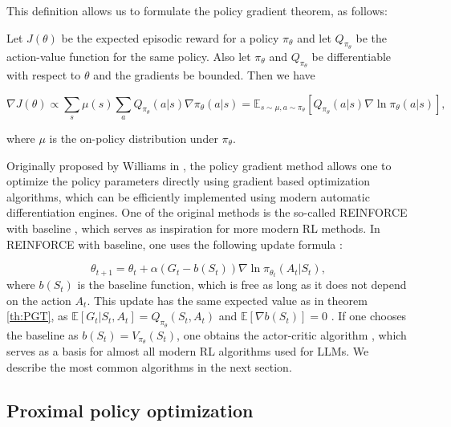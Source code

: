 This definition allows us to formulate the policy gradient theorem, as follows\cite{SuttonPolicyGradientTheorem, SuttonAndBarto2018, lehmann2024definitiveguidepolicygradients}:


\begin{theorem}
    Let $J(\theta)$ be the expected episodic reward for a policy $\pi_\theta$ and let $Q_{\pi_\theta}$ be the action-value function for the same policy. Also let $\pi_\theta$ and $Q_{\pi_\theta}$ be differentiable with respect to $\theta$ and the gradients be bounded. Then we have

    \begin{equation}
        \nabla J(\theta)\propto\sum_s\mu(s)\sum_a Q_{\pi_\theta}(a | s)\nabla\pi_\theta(a | s) = \mathbb{E}_{s\sim\mu,a\sim\pi_\theta}[Q_{\pi_\theta}(a | s)\nabla\ln\pi_\theta(a | s)],
    \end{equation}

    where $\mu$ is the on-policy distribution under $\pi_\theta$.

    \label{th:PGT}
\end{theorem}

Originally proposed by Williams in \cite{Williams1992}, the policy gradient method allows one to optimize the policy parameters directly using gradient based optimization algorithms, which can be efficiently implemented using modern automatic differentiation engines. One of the original methods is the so-called REINFORCE with baseline \cite{Williams1992}, which serves as inspiration for more modern RL methods. In REINFORCE with baseline, one uses the following update formula \cite{SuttonAndBarto2018}:

\begin{equation*}
    \theta_{t+1} = \theta_t + \alpha(G_t - b(S_t))\nabla\ln\pi_{\theta_t}(A_t | S_t),
\end{equation*}
where $b(S_t)$ is the baseline function, which is free as long as it does not depend on the action $A_t$. This update has the same expected value as in theorem \ref{th:PGT}, as $\mathbb{E}[G_t | S_t, A_t] = Q_{\pi_\theta}(S_t, A_t)$ and $\mathbb{E}[\nabla b(S_t)] = 0$ \cite{SuttonAndBarto2018}. If one chooses the baseline as $b(S_t) = V_{\pi_\theta}(S_t)$, one obtains the actor-critic algorithm \cite{Actor-criticAlgorithms}, which serves as a basis for almost all modern RL algorithms used for LLMs. We describe the most common algorithms in the next section.



\subsection{Proximal policy optimization}

